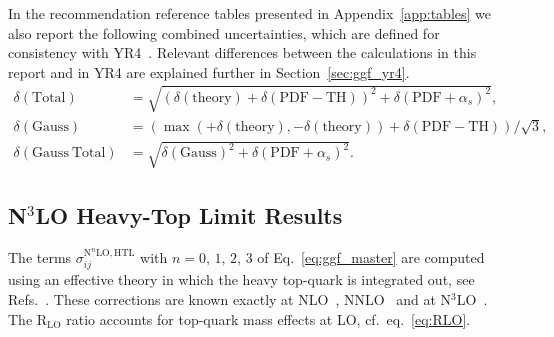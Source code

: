 In the recommendation reference tables presented in Appendix~\ref{app:tables} we also report the following combined uncertainties, which are defined for consistency with YR4~\cite{LHCHiggsCrossSectionWorkingGroup:2016ypw}. Relevant differences between the calculations in this report and in YR4 are explained further in Section~\ref{sec:ggf_yr4}.
\begin{align}
\delta(\mathrm{Total}) &= \sqrt{ (\delta(\mathrm{theory}) + \delta(\mathrm{PDF-TH}))^2 + \delta(\mathrm{PDF}+\alpha_s)^2 }, \\
\delta(\mathrm{Gauss}) &= (\max(+\delta(\mathrm{theory}),-\delta(\mathrm{theory})) + \delta(\mathrm{PDF-TH}))/\sqrt{3}, \\
\delta(\mathrm{Gauss\ Total}) &= \sqrt{ \delta(\mathrm{Gauss})^2 + \delta(\mathrm{PDF}+\alpha_s)^2}.
\end{align}

\subsection{N$^3$LO Heavy-Top Limit Results}
\label{sec:ggf_htl}

The terms $\sigma_{ij}^{\mathrm{N}^n\mathrm{LO},\mathrm{HTL}}$ with $n=0,\,1,\,2,\,3$ of Eq.~\eqref{eq:ggf_master} are computed using an effective theory in which the heavy top-quark is integrated out, see Refs.~\cite{Kramer:1996iq,Chetyrkin:1997un,Schroder:2005hy,Chetyrkin:2005ia}.
These corrections are known exactly at NLO~\cite{Dawson:1990zj,Djouadi:1991tka}, NNLO~\cite{Anastasiou:2002yz,Harlander:2002wh,Ravindran:2003um} and at N$^3$LO~\cite{Anastasiou:2016cez,Anastasiou:2015vya,Mistlberger:2018etf}.
The $\mathrm{R}_\mathrm{LO}$ ratio accounts for top-quark mass effects at LO, cf.\ eq.~\eqref{eq:RLO}.


